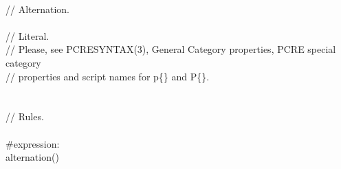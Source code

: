 \begin{bigbigpre}
 \\
// Alternation. \\
 \\
// Literal. \\
// Please, see PCRESYNTAX(3), General Category properties, PCRE special category \\
// properties and script names for \bslash{}p\{\} and \bslash{}P\{\}. \\
 \\
 \\
// Rules. \\
 \\
#expression: \\
    alternation() \\

\end{bigbigpre}
